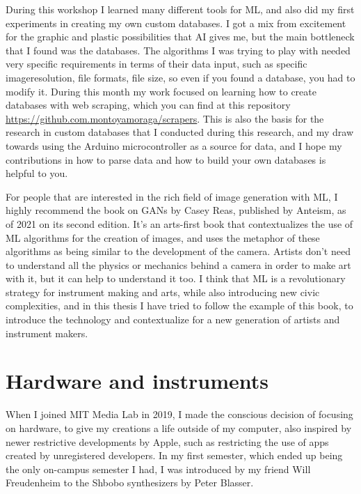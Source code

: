 During this workshop I learned many different tools for \acrshort{ML}, and also did my first experiments in creating my own custom databases. I got a mix from excitement for the graphic and plastic possibilities that \acrshort{AI} gives me, but the main bottleneck that I found was the databases. The algorithms I was trying to play with needed very specific requirements in terms of their data input, such as specific imageresolution, file formats, file size, so even if you found a database, you had to modify it. During this month my work focused on learning how to create databases with web scraping, which you can find at this repository \url{https://github.com.montoyamoraga/scrapers}. This is also the basis for the research in custom databases that I conducted during this research, and my draw towards using the Arduino microcontroller as a source for data, and I hope my contributions in how to parse data and how to build your own databases is helpful to you.

For people that are interested in the rich field of image generation with \acrshort{ML}, I highly recommend the book on GANs by Casey Reas, published by Anteism, as of 2021 on its second edition. It’s an arts-first book that contextualizes the use of \acrshort{ML} algorithms for the creation of images, and uses the metaphor of these algorithms as being similar to the development of the camera. Artists don’t need to understand all the physics or mechanics behind a camera in order to make art with it, but it can help to understand it too. I think that \acrshort{ML} is a revolutionary strategy for instrument making and arts, while also introducing new civic complexities, and in this thesis I have tried to follow the example of this book, to introduce the technology and contextualize for a new generation of artists and instrument makers.

\section{Hardware and instruments}


When I joined MIT Media Lab in 2019, I made the conscious decision of focusing on hardware, to give my creations a life outside of my computer, also inspired by newer restrictive developments by Apple, such as restricting the use of apps created by unregistered developers. In my first semester, which ended up being the only on-campus semester I had, I was introduced by my friend Will Freudenheim to the Shbobo synthesizers by Peter Blasser.


